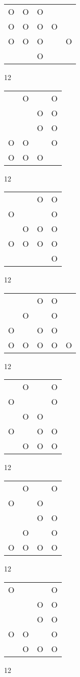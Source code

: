 \begin{tabular}{|m{0.2cm}m{0.2cm}m{0.2cm}m{0.2cm}m{0.2cm}|}\hline
O&O&O& & \\
O&O&O&O& \\
O&O&O& &O\\
 & &O& & \\
\hline\end{tabular}12
\begin{tabular}{|m{0.2cm}m{0.2cm}m{0.2cm}m{0.2cm}|}\hline
 &O& &O\\
 & &O&O\\
 & &O&O\\
O&O& &O\\
O&O&O& \\
\hline\end{tabular}12
\begin{tabular}{|m{0.2cm}m{0.2cm}m{0.2cm}m{0.2cm}|}\hline
 & &O&O\\
O& & &O\\
 &O&O&O\\
O&O&O&O\\
 & & &O\\
\hline\end{tabular}12
\begin{tabular}{|m{0.2cm}m{0.2cm}m{0.2cm}m{0.2cm}m{0.2cm}|}\hline
 & &O&O& \\
 &O& &O& \\
O& &O&O& \\
O&O&O&O&O\\
\hline\end{tabular}12
\begin{tabular}{|m{0.2cm}m{0.2cm}m{0.2cm}m{0.2cm}|}\hline
 &O& &O\\
O& & &O\\
 &O&O& \\
O& &O&O\\
 &O&O&O\\
\hline\end{tabular}12
\begin{tabular}{|m{0.2cm}m{0.2cm}m{0.2cm}m{0.2cm}|}\hline
 &O& &O\\
O& &O& \\
 & &O&O\\
 &O& &O\\
O&O&O&O\\
\hline\end{tabular}12
\begin{tabular}{|m{0.2cm}m{0.2cm}m{0.2cm}m{0.2cm}|}\hline
O& & &O\\
 & &O&O\\
 & &O&O\\
O&O& &O\\
 &O&O&O\\
\hline\end{tabular}12

